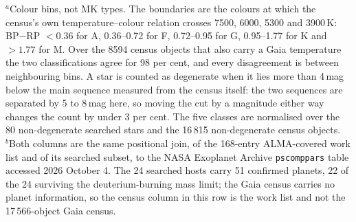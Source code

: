 \begin{table}
\smallskip
{\footnotesize $^{a}$Colour bins, not MK types. The boundaries are the colours at which the census's own temperature--colour relation crosses 7500, 6000, 5300 and 3900\,K: BP$-$RP $<0.36$ for A, 0.36--0.72 for F, 0.72--0.95 for G, 0.95--1.77 for K and $>1.77$ for M. Over the 8594 census objects that also carry a Gaia temperature the two classifications agree for 98 per cent, and every disagreement is between neighbouring bins. A star is counted as degenerate when it lies more than 4\,mag below the main sequence measured from the census itself: the two sequences are separated by 5 to 8\,mag here, so moving the cut by a magnitude either way changes the count by under 3 per cent. The five classes are normalised over the 80 non-degenerate searched stars and the 16\,815 non-degenerate census objects.\\ $^{b}$Both columns are the same positional join, of the 168-entry ALMA-covered work list and of its searched subset, to the NASA Exoplanet Archive \texttt{pscomppars} table accessed 2026 October 4. The 24 searched hosts carry 51 confirmed planets, 22 of the 24 surviving the deuterium-burning mass limit; the Gaia census carries no planet information, so the census column in this row is the work list and not the 17\,566-object Gaia census.}
\end{table}
